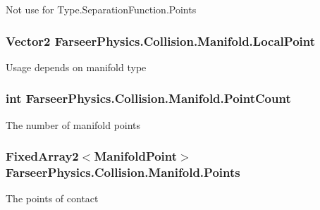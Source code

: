 Not use for Type.\+Separation\+Function.\+Points 

\hypertarget{struct_farseer_physics_1_1_collision_1_1_manifold_a6502701f36cda294be0ffe4f081cb6ed}{
\subsubsection[{Local\+Point}]{\setlength{\rightskip}{0pt plus 5cm}Vector2 Farseer\+Physics.\+Collision.\+Manifold.\+Local\+Point}}\label{struct_farseer_physics_1_1_collision_1_1_manifold_a6502701f36cda294be0ffe4f081cb6ed}


Usage depends on manifold type 

\hypertarget{struct_farseer_physics_1_1_collision_1_1_manifold_ac56b36d7ff7370ee663f27d62537ef3d}{
\subsubsection[{Point\+Count}]{\setlength{\rightskip}{0pt plus 5cm}int Farseer\+Physics.\+Collision.\+Manifold.\+Point\+Count}}\label{struct_farseer_physics_1_1_collision_1_1_manifold_ac56b36d7ff7370ee663f27d62537ef3d}


The number of manifold points 

\hypertarget{struct_farseer_physics_1_1_collision_1_1_manifold_a37a6a5311e01b146c829ce90c3cfb3d1}{
\subsubsection[{Points}]{\setlength{\rightskip}{0pt plus 5cm}Fixed\+Array2$<${\bf Manifold\+Point}$>$ Farseer\+Physics.\+Collision.\+Manifold.\+Points}}\label{struct_farseer_physics_1_1_collision_1_1_manifold_a37a6a5311e01b146c829ce90c3cfb3d1}


The points of contact 

